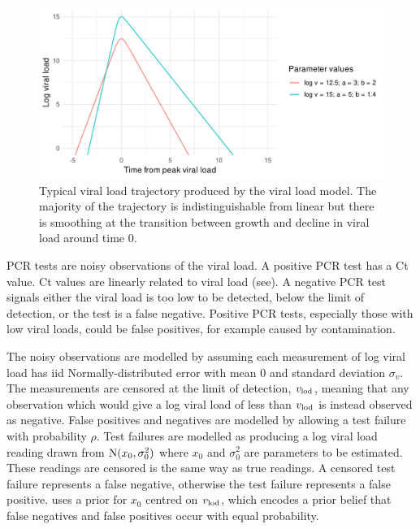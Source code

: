 \documentclass[thesis.tex]{subfiles}
\begin{document}
\begin{figure}
  \centering \includegraphics{ATACCC/typical_trajectory}
  \caption[Typical viral load model trajectory.]{Typical viral load trajectory produced by the \textcite{hakkiOnset} viral load model. The majority of the trajectory is indistinguishable from linear but there is smoothing at the transition between growth and decline in viral load around time 0. \label{ATACCC:fig:viral-load-model}}
\end{figure}

PCR tests are noisy observations of the viral load.
A positive PCR test has a Ct value.
Ct values are linearly related to viral load (see).
A negative PCR test signals either the viral load is too low to be detected, \ie below the limit of detection, or the test is a false negative.
Positive PCR tests, especially those with low viral loads, could be false positives, for example caused by contamination.

The noisy observations are modelled by assuming each measurement of log viral load has iid Normally-distributed error with mean 0 and standard deviation $\sigma_v$.
The measurements are censored at the limit of detection, $v_\text{lod}$, meaning that any observation which would give a log viral load of less than $v_\text{lod}$ is instead observed as negative.
False positives and negatives are modelled by allowing a test failure with probability $\rho$.
Test failures are modelled as producing a log viral load reading drawn from $\operatorname{N}(x_0, \sigma_0^2)$ where $x_0$ and $\sigma_0^2$ are parameters to be estimated.
These readings are censored is the same way as true readings.
A censored test failure represents a false negative, otherwise the test failure represents a false positive.
\textcite{hakkiOnset} uses a prior for $x_0$ centred on $v_\text{lod}$, which encodes a prior belief that false negatives and false positives occur with equal probability.
\end{document}
